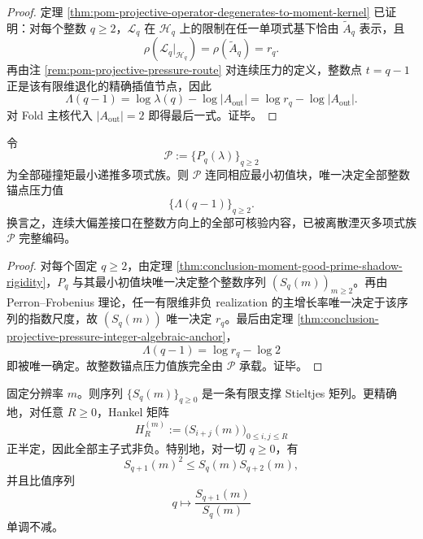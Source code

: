 \begin{proof}
定理 \ref{thm:pom-projective-operator-degenerates-to-moment-kernel} 已证明：对每个整数 \(q\ge 2\)，\(\mathcal L_q\) 在 \(\mathcal H_q\) 上的限制在任一单项式基下恰由 \(\widetilde A_q\) 表示，且
\[
\rho(\mathcal L_q\vert_{\mathcal H_q})=\rho(\widetilde A_q)=r_q.
\]
再由注 \ref{rem:pom-projective-pressure-route} 对连续压力的定义，整数点 \(t=q-1\) 正是该有限维退化的精确插值节点，因此
\[
\Lambda(q-1)=\log\lambda(q)-\log |A_{\mathrm{out}}|
=\log r_q-\log |A_{\mathrm{out}}|.
\]
对 Fold 主核代入 \(|A_{\mathrm{out}}|=2\) 即得最后一式。证毕。
\end{proof}

\begin{theorem}[大偏差骨架由离散湮灭多项式族完全承载]\label{thm:conclusion-large-deviation-skeleton-carried-by-annihilator-family}
令
\[
\mathscr P:=\{P_q(\lambda)\}_{q\ge 2}
\]
为全部碰撞矩最小递推多项式族。则 \(\mathscr P\) 连同相应最小初值块，唯一决定全部整数锚点压力值
\[
\{\Lambda(q-1)\}_{q\ge 2}.
\]
换言之，连续大偏差接口在整数方向上的全部可核验内容，已被离散湮灭多项式族 \(\mathscr P\) 完整编码。
\end{theorem}

\begin{proof}
对每个固定 \(q\ge 2\)，由定理 \ref{thm:conclusion-moment-good-prime-shadow-rigidity}，\(P_q\) 与其最小初值块唯一决定整个整数序列 \((S_q(m))_{m\ge 2}\)。再由 Perron--Frobenius 理论，任一有限维非负 realization 的主增长率唯一决定于该序列的指数尺度，故 \((S_q(m))\) 唯一决定 \(r_q\)。最后由定理 \ref{thm:conclusion-projective-pressure-integer-algebraic-anchor}，
\[
\Lambda(q-1)=\log r_q-\log 2
\]
即被唯一确定。故整数锚点压力值族完全由 \(\mathscr P\) 承载。证毕。
\end{proof}

\begin{theorem}\label{thm:conclusion-collision-moment-stieltjes-hankel-positivity}
固定分辨率 \(m\)。则序列 \(\{S_q(m)\}_{q\ge 0}\) 是一条有限支撑 Stieltjes 矩列。更精确地，对任意 \(R\ge 0\)，Hankel 矩阵
\[
H_R^{(m)}:=\bigl(S_{i+j}(m)\bigr)_{0\le i,j\le R}
\]
正半定，因此全部主子式非负。特别地，对一切 \(q\ge 0\)，有
\[
S_{q+1}(m)^2\le S_q(m)S_{q+2}(m),
\]
并且比值序列
\[
q\longmapsto \frac{S_{q+1}(m)}{S_q(m)}
\]
单调不减。
\end{theorem}

